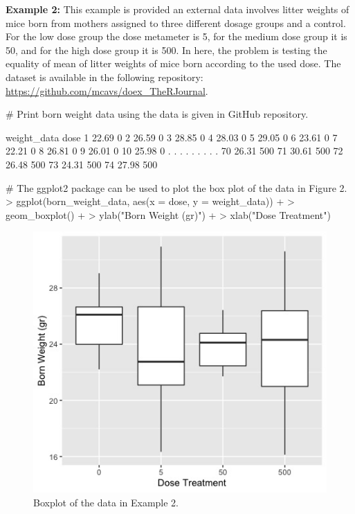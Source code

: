 \noindent \textbf{Example 2:} This example is provided an external data involves litter weights of mice born from mothers assigned to three different dosage groups and a control. For the low dose group the dose metameter is 5, for the medium dose group it is 50, and for the high dose group it is 500. In here, the problem is testing the equality of mean of litter weights of mice born according to the used dose. The dataset is available in the following repository: \url{https://github.com/mcavs/doex_TheRJournal}.

\begin{example}
# Print born weight data using the data is given in GitHub repository.

   weight_data dose
1        22.69    0
2        26.59    0
3        28.85    0
4        28.03    0
5        29.05    0
6        23.61    0
7        22.21    0
8        26.81    0
9        26.01    0
10       25.98    0
.	.	.
.	.	.
.	.	.
70       26.31  500
71       30.61  500
72       26.48  500
73       24.31  500
74       27.98  500

# The ggplot2 package can be used to plot the box plot of the data in Figure 2.
> ggplot(born_weight_data, aes(x = dose, y = weight_data)) + 
>  geom_boxplot() +
>  ylab("Born Weight (gr)") +
>  xlab("Dose Treatment")

\end{example}


\begin{figure}
\centering
\includegraphics[scale=0.5]{boxplot_ex2.png}
\caption{Boxplot of the data in Example 2.}
\label{fig:ex2}
\end{figure}

